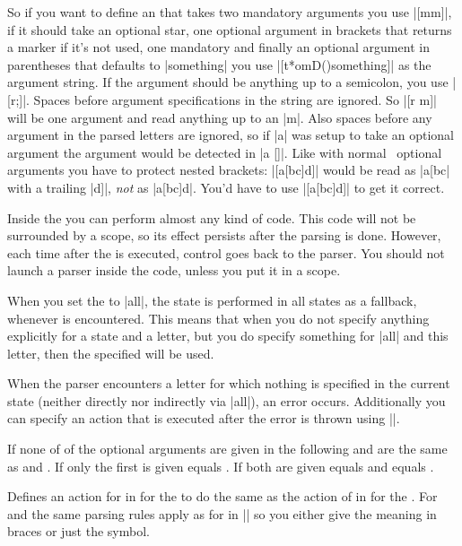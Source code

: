 \begin{command}
  So if you want to define an  that takes two mandatory arguments
  you use |[mm]|, if it should take an optional star, one optional argument in
  brackets that returns a marker if it's not used, one mandatory and finally an
  optional argument in parentheses that defaults to |something| you use
  |[t*omD(){something}]| as the argument string. If the argument should be
  anything up to a semicolon, you use |[r;]|. Spaces before argument
  specifications in the string are ignored. So |[r m]| will be one argument and
  read anything up to an |m|. Also spaces before any argument in the parsed
  letters are ignored, so if |a| was setup to take an optional argument the
  argument would be detected in |a []|. Like with normal \LaTeXe\ optional
  arguments you have to protect nested brackets: |[a[bc]d]| would be read as
  |a[bc| with a trailing |d]|, \emph{not} as |a[bc]d|. You'd have to use
  |[{a[bc]d}]| to get it correct.

  Inside the  you can perform almost any kind of code. This code
  will not be surrounded by a scope, so its effect persists after the parsing
  is done. However, each time after the  is executed, control
  goes back to the parser. You should not launch a parser inside the
   code, unless you put it in a scope.

  When you set the  to |all|, the state  is performed
  in all states as a fallback, whenever  is encountered.
  This means that when you do not specify anything explicitly for a state and a
  letter, but you do specify something for |all| and this letter, then the
  specified  will be used.

  When the parser encounters a letter for which nothing is specified in the
  current state (neither directly nor indirectly via |all|), an error occurs.
  Additionally you can specify an action that is executed after the error is
  thrown using |\pgfparserdefunknown|.
\end{command}%

\begin{command}%
  {%
    \pgfparserlet
  }%
  If none of of the optional arguments are given in the following  and  are the same as  and
  . If only the first is given  equals
  . If both are given  equals  and
   equals .

  Defines an action for  in  for the
   to do the same as the action of %
  in  for the . For %
  and  the same parsing rules apply as for  in |\pgfparserdef| so you either give the meaning in braces or just
  the symbol.
\end{command}%

